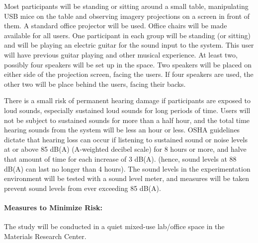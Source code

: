 \documentclass[10pt]{article}
\begin{document}
Most participants will be standing or sitting around a small table, manipulating
USB mice on the table and observing imagery projections
on a screen in front of them. A standard office projector will be used. 
Office chairs will be made available for all users.
One participant in each group will be standing (or sitting) 
and will be playing an electric guitar for the sound input to the system.
This user will have previous guitar playing and other musical experience. 
At least two, possibly four speakers will be set up in the space. Two speakers 
will be placed on either side of the projection screen, facing the users. 
If four speakers are used, the other two will be place behind the users, facing 
their backs. 

There is a small risk of permanent hearing damage if participants are exposed 
to loud sounds, especially sustained loud sounds for long periods of time. 
Users will not be subject to sustained sounds for more than a half hour, and 
the total time hearing sounds from the system will be less an hour or less.
OSHA guidelines dictate that hearing loss can occur if listening to sustained 
sound or noise levels at or above 85 dB(A) (A-weighted decibel scale) 
for 8 hours or more, and halve that 
amount of time for each increase of 3 dB(A). (hence, sound levels at 88 dB(A) can 
last no longer than 4 hours). The sound levels in the experimentation environment 
will be tested with a sound level meter, and measures will be taken prevent sound 
levels from ever exceeding 85 dB(A). 


\paragraph{Measures to Minimize Risk:}
\vspace{0.1in}
\noindent
The study will be conducted in a quiet mixed-use lab/office space in
the Materials Research Center.

\end{document}

